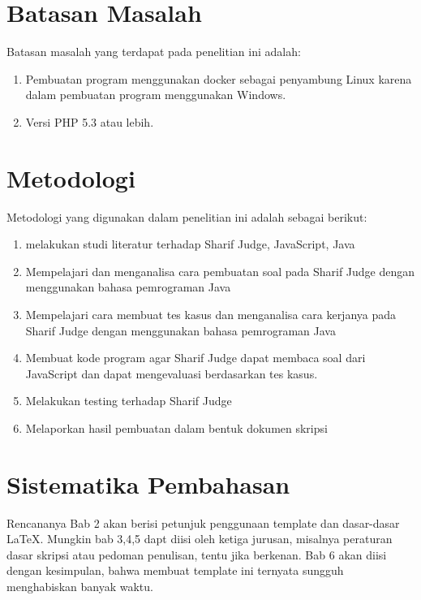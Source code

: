 \section{Batasan Masalah}
\label{sec:batasan}
Batasan masalah yang terdapat pada penelitian ini adalah:
\begin{enumerate}
    \item Pembuatan program menggunakan docker sebagai penyambung Linux karena dalam pembuatan program menggunakan Windows.
    \item Versi PHP 5.3 atau lebih.
\end{enumerate}







\section{Metodologi}
\label{sec:metlit}
Metodologi yang digunakan dalam penelitian ini adalah sebagai berikut:
\begin{enumerate}
    \item melakukan studi literatur terhadap Sharif Judge, JavaScript, Java
    \item Mempelajari dan menganalisa cara pembuatan soal pada Sharif Judge dengan menggunakan bahasa pemrograman Java
    \item Mempelajari cara membuat tes kasus dan menganalisa cara kerjanya pada Sharif Judge dengan menggunakan bahasa pemrograman Java
    \item Membuat kode program agar Sharif Judge dapat membaca soal dari JavaScript dan dapat mengevaluasi berdasarkan tes kasus.
    \item Melakukan testing terhadap Sharif Judge
    \item Melaporkan hasil pembuatan dalam bentuk dokumen skripsi
\end{enumerate}

\section{Sistematika Pembahasan}
\label{sec:sispem}
Rencananya Bab 2 akan berisi petunjuk penggunaan template dan dasar-dasar \LaTeX.
Mungkin bab 3,4,5 dapt diisi oleh ketiga jurusan, misalnya peraturan dasar skripsi atau pedoman penulisan, tentu jika berkenan.
Bab 6 akan diisi dengan kesimpulan, bahwa membuat template ini ternyata sungguh menghabiskan banyak waktu.





